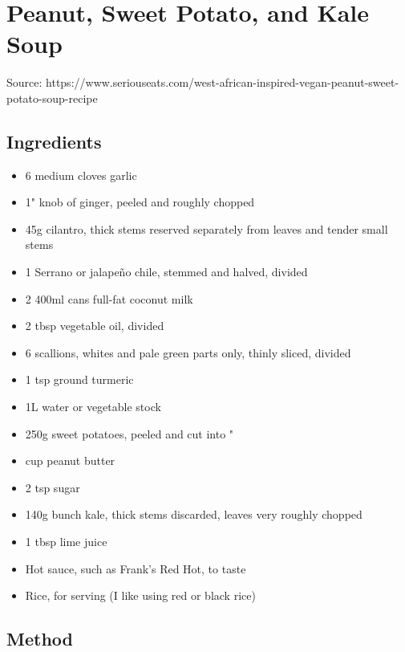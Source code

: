 \section{Peanut, Sweet Potato, and Kale Soup}


Source: https://www.seriouseats.com/west-african-inspired-vegan-peanut-sweet-potato-soup-recipe

\subsection{Ingredients}

\begin{itemize}
    \item 6 medium cloves garlic
    \item 1" knob of ginger, peeled and roughly chopped
    \item 45g cilantro, thick stems reserved separately from leaves and tender small stems
    \item 1 Serrano or jalapeño chile, stemmed and halved, divided
    \item 2 400ml cans full-fat coconut milk
    \item 2 tbsp vegetable oil, divided
    \item 6 scallions, whites and pale green parts only, thinly sliced, divided
    \item 1 tsp ground turmeric
    \item 1L water or vegetable stock
    \item 250g sweet potatoes, peeled and cut into "
    \item {} cup peanut butter
    \item 2 tsp sugar
    \item 140g bunch kale, thick stems discarded, leaves very roughly chopped
    \item 1 tbsp lime juice
    \item Hot sauce, such as Frank's Red Hot, to taste
    \item Rice, for serving (I like using red or black rice)
\end{itemize}

\subsection{Method}

